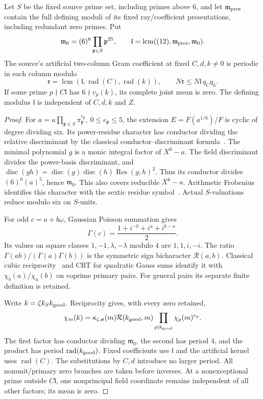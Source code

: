 \begin{proposition}\label{prop:fixed-period}
Let $S$ be the fixed source prime set, including primes above $6$, and
let $\mathfrak m_{\rm pres}$ contain the full defining moduli of its
fixed ray/coefficient presentations, including redundant zero primes. Put
\[
 \mathfrak m_0=(6)^6\prod_{\mathfrak p\in S}\mathfrak p^{25},
 \qquad
 \mathfrak l=\operatorname{lcm}((12),\mathfrak m_{\rm pres},\mathfrak m_0).
\]
The source's artificial two-column Gram coefficient at fixed $C,d,k\ne0$
is periodic in each column modulo
\[
 \mathfrak r=\operatorname{lcm}
   (\mathfrak l,\operatorname{rad}(C),\operatorname{rad}(k)),
 \qquad N\mathfrak r\le N\mathfrak l\,q_Cq_k.
\]
If some prime $p\nmid C\mathfrak l$ has $6\nmid v_p(k)$,
its complete joint mean is zero.
The defining modulus $\mathfrak l$ is independent of $C,d,k$ and $Z$.
\end{proposition}
\begin{proof}
For $a=u\prod_{\mathfrak p\in S}\pi_{\mathfrak p}^{e_{\mathfrak p}}$,
$0\le e_{\mathfrak p}\le5$, the extension
$E=F(a^{1/6})/F$ is cyclic of degree dividing six. Its power-residue
character has conductor dividing the relative discriminant by the
classical conductor--discriminant formula~\cite[Theorem V.3.27]{milnecft}.
The minimal polynomial $g$ is a monic integral factor of $X^6-a$.
The field discriminant divides the power-basis discriminant, and
$\operatorname{disc}(gh)=\operatorname{disc}(g)\operatorname{disc}(h)
\operatorname{Res}(g,h)^2$. Thus its conductor divides
$(6)^6(a)^5$, hence $\mathfrak m_0$. This also covers reducible $X^6-a$.
Arithmetic Frobenius identifies this character with the sextic residue
symbol~\cite[Sections VIII.5.3--5.5]{milnecft}. Actual $S$-valuations
reduce modulo six on $S$-units.

For odd $c=a+b\omega$, Gaussian Poisson summation gives
\[
 \Gamma(c)=\frac{1+i^{-b}+i^a+i^{b-a}}2.
\]
Its values on square classes $1,-1,\lambda,-\lambda$ modulo $4$ are
$1,1,i,-i$. The ratio
$\Gamma(ab)/(\Gamma(a)\Gamma(b))$ is the symmetric sign bicharacter
$\mathcal R(a,b)$. Classical cubic reciprocity~\cite[Equation (1.4)]{dunnradziwill}
and CRT for quadratic Gauss sums identify it with
$\chi_b(a)/\chi_a(b)$ on coprime primary pairs.
For general pairs its separate finite definition is retained.

Write $k=\zeta k_Sk_{\rm good}$. Reciprocity gives, with every zero retained,
\[
 \chi_m(k)=\kappa_{\zeta,\boldsymbol e}(m)
       \mathcal R(k_{\rm good},m)
       \prod_{p\mid k_{\rm good}}\chi_p(m)^{e_p}.
\]
The first factor has conductor dividing $\mathfrak m_0$, the second has
period $4$, and the product has period $\operatorname{rad}(k_{\rm good})$.
Fixed coefficients use $\mathfrak l$ and the artificial kernel uses
$\operatorname{rad}(C)$. The substitutions by $C,d$ introduce no larger
period. All nonunit/primary zero branches are taken before inverses.
At a nonexceptional prime outside $C\mathfrak l$, one nonprincipal
field coordinate remains independent of all other factors; its mean is zero.
\end{proof}

